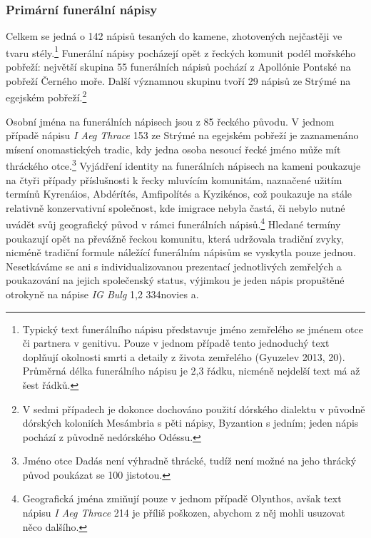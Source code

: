 \subsubsection[primární-funerální-nápisy-1]{Primární funerální nápisy}

Celkem se jedná o 142 nápisů tesaných do kamene, zhotovených nejčastěji ve tvaru stély.\footnote{Typický text funerálního nápisu představuje jméno zemřelého se jménem otce či partnera v genitivu. Pouze v jednom případě tento jednoduchý text doplňují okolnosti smrti a detaily z života zemřelého (Gyuzelev 2013, 20). Průměrná délka funerálního nápisu je 2,3 řádku, nicméně nejdelší text má až šest řádků.} Funerální nápisy pocházejí opět z řeckých komunit podél mořského pobřeží: největší skupina 55 funerálních nápisů pochází z Apollónie Pontské na pobřeží Černého moře. Další významnou skupinu tvoří 29 nápisů ze Strýmé na egejském pobřeží.\footnote{V sedmi případech je dokonce dochováno použití dórského dialektu v původně dórských koloniích Mesámbria s pěti nápisy, Byzantion s jedním; jeden nápis pochází z původně nedórského Odéssu.}

Osobní jména na funerálních nápisech jsou z 85  řeckého původu. V jednom případě nápisu {\em I Aeg Thrace} 153 ze Strýmé na egejském pobřeží je zaznamenáno mísení onomastických tradic, kdy jedna osoba nesoucí řecké jméno může mít thráckého otce.\footnote{Jméno otce Dadás není výhradně thrácké, tudíž není možné na jeho thrácký původ poukázat se 100  jistotou.} Vyjádření identity na funerálních nápisech na kameni poukazuje na čtyři případy příslušnosti k řecky mluvícím komunitám, naznačené užitím termínů Kyrenáios, Abdérítés, Amfipolítés a Kyzikénos, což poukazuje na stále relativně konzervativní společnost, kde imigrace nebyla častá, či nebylo nutné uvádět svůj geografický původ v rámci funerálních nápisů.\footnote{Geografická jména zmiňují pouze v jednom případě Olynthos, avšak text nápisu {\em I Aeg Thrace} 214 je příliš poškozen, abychom z něj mohli usuzovat něco dalšího.} Hledané termíny poukazují opět na převážně řeckou komunitu, která udržovala tradiční zvyky, nicméně tradiční formule náležící funerálním nápisům se vyskytla pouze jednou. Nesetkáváme se ani s individualizovanou prezentací jednotlivých zemřelých a poukazování na jejich společenský status, výjimkou je jeden nápis propuštěné otrokyně na nápise {\em IG Bulg} 1,2 334novies a.

